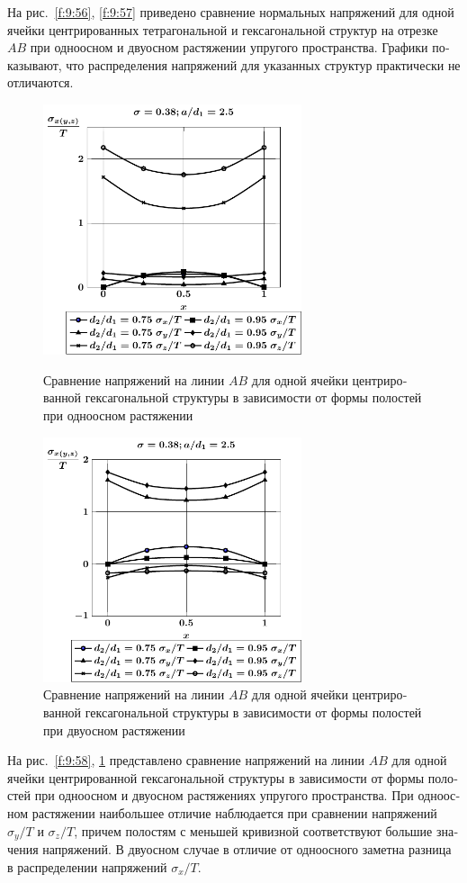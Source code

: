 \begin{russian}
На рис.~\ref{f:9:56}, \ref{f:9:57} приведено сравнение нормальных напряжений для одной ячейки центрированных тетрагональной и гексагональной структур на отрезке $AB$ при одноосном и двуосном растяжении упругого пространства. Графики показывают, что распределения напряжений для указанных структур практически не отличаются.

\begin{figure}[h!]
\centering\footnotesize
\parbox[b]{7.5cm}{\centering\includegraphics[width=7.6cm]{cav13-d-a25-t1.pdf}
\caption{Сравнение напряжений на линии $AB$ для одной ячейки центрированной гексагональной структуры в зависимости от формы полостей при одноосном растяжении 
\label{f:9:58}}}\hfil\hfil
\parbox[b]{7.5cm}{\centering\includegraphics[width=7.6cm]{cav13-d-a25-t2.pdf}
\caption{Сравнение напряжений на линии $AB$ для одной ячейки центрированной гексагональной структуры в зависимости от формы полостей при двуосном растяжении
\label{f:9:59}}}
\end{figure}

На рис.~\ref{f:9:58}, \ref{f:9:59} представлено сравнение напряжений на линии $AB$ для одной ячейки центрированной гексагональной структуры в зависимости от формы полостей при одноосном и двуосном растяжениях упругого пространства. При одноосном растяжении наибольшее отличие наблюдается при сравнении напряжений $\sigma_y/T$ и $\sigma_z/T$, причем полостям с меньшей кривизной соответствуют большие значения напряжений. В двуосном случае в отличие от одноосного заметна разница в распределении напряжений $\sigma_x/T$.


\end{russian}
